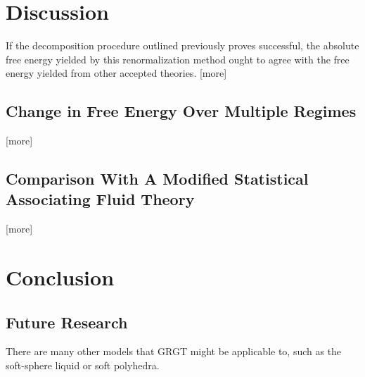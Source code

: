 \documentclass[12pt]{article}
\begin{document}

\section{Discussion}
If the decomposition procedure outlined previously proves successful, the absolute free energy yielded by this renormalization method ought to agree with the free energy yielded from other accepted theories. [more]
\subsection{Change in Free Energy Over Multiple Regimes}
[more]
\subsection{Comparison With A Modified Statistical Associating Fluid Theory}
[more]



\section{Conclusion}


\subsection{Future Research}
There are many other models that GRGT might be applicable to, such as the soft-sphere liquid or soft polyhedra.
%

\end{document}
